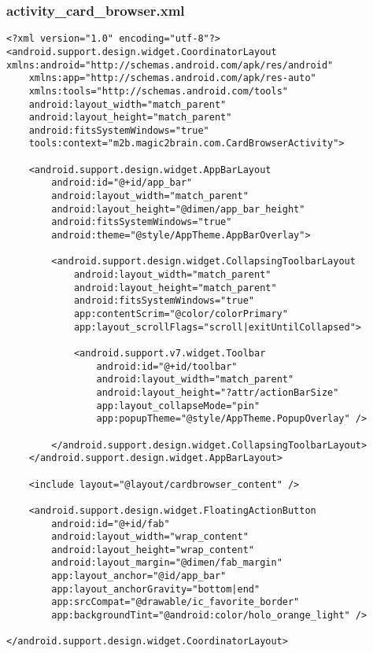 \subsubsection*{activity\_card\_browser.xml}
\begin{lstlisting}
<?xml version="1.0" encoding="utf-8"?>
<android.support.design.widget.CoordinatorLayout xmlns:android="http://schemas.android.com/apk/res/android"
    xmlns:app="http://schemas.android.com/apk/res-auto"
    xmlns:tools="http://schemas.android.com/tools"
    android:layout_width="match_parent"
    android:layout_height="match_parent"
    android:fitsSystemWindows="true"
    tools:context="m2b.magic2brain.com.CardBrowserActivity">

    <android.support.design.widget.AppBarLayout
        android:id="@+id/app_bar"
        android:layout_width="match_parent"
        android:layout_height="@dimen/app_bar_height"
        android:fitsSystemWindows="true"
        android:theme="@style/AppTheme.AppBarOverlay">

        <android.support.design.widget.CollapsingToolbarLayout
            android:layout_width="match_parent"
            android:layout_height="match_parent"
            android:fitsSystemWindows="true"
            app:contentScrim="@color/colorPrimary"
            app:layout_scrollFlags="scroll|exitUntilCollapsed">

            <android.support.v7.widget.Toolbar
                android:id="@+id/toolbar"
                android:layout_width="match_parent"
                android:layout_height="?attr/actionBarSize"
                app:layout_collapseMode="pin"
                app:popupTheme="@style/AppTheme.PopupOverlay" />

        </android.support.design.widget.CollapsingToolbarLayout>
    </android.support.design.widget.AppBarLayout>

    <include layout="@layout/cardbrowser_content" />

    <android.support.design.widget.FloatingActionButton
        android:id="@+id/fab"
        android:layout_width="wrap_content"
        android:layout_height="wrap_content"
        android:layout_margin="@dimen/fab_margin"
        app:layout_anchor="@id/app_bar"
        app:layout_anchorGravity="bottom|end"
        app:srcCompat="@drawable/ic_favorite_border"
        app:backgroundTint="@android:color/holo_orange_light" />

</android.support.design.widget.CoordinatorLayout>
\end{lstlisting}

